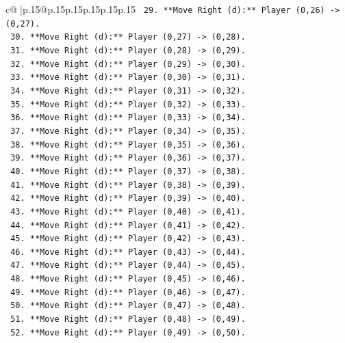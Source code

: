 \documentclass{article}
\begin{document}
{\begin{supertabular}{c@{$\;$}|p{.15\linewidth}@{}p{.15\linewidth}p{.15\linewidth}p{.15\linewidth}p{.15\linewidth}p{.15\linewidth}}
{{{\texttt{        29. **Move Right (d):** Player (0,26) {-}> (0,27).} \\
\texttt{        30. **Move Right (d):** Player (0,27) {-}> (0,28).} \\
\texttt{        31. **Move Right (d):** Player (0,28) {-}> (0,29).} \\
\texttt{        32. **Move Right (d):** Player (0,29) {-}> (0,30).} \\
\texttt{        33. **Move Right (d):** Player (0,30) {-}> (0,31).} \\
\texttt{        34. **Move Right (d):** Player (0,31) {-}> (0,32).} \\
\texttt{        35. **Move Right (d):** Player (0,32) {-}> (0,33).} \\
\texttt{        36. **Move Right (d):** Player (0,33) {-}> (0,34).} \\
\texttt{        37. **Move Right (d):** Player (0,34) {-}> (0,35).} \\
\texttt{        38. **Move Right (d):** Player (0,35) {-}> (0,36).} \\
\texttt{        39. **Move Right (d):** Player (0,36) {-}> (0,37).} \\
\texttt{        40. **Move Right (d):** Player (0,37) {-}> (0,38).} \\
\texttt{        41. **Move Right (d):** Player (0,38) {-}> (0,39).} \\
\texttt{        42. **Move Right (d):** Player (0,39) {-}> (0,40).} \\
\texttt{        43. **Move Right (d):** Player (0,40) {-}> (0,41).} \\
\texttt{        44. **Move Right (d):** Player (0,41) {-}> (0,42).} \\
\texttt{        45. **Move Right (d):** Player (0,42) {-}> (0,43).} \\
\texttt{        46. **Move Right (d):** Player (0,43) {-}> (0,44).} \\
\texttt{        47. **Move Right (d):** Player (0,44) {-}> (0,45).} \\
\texttt{        48. **Move Right (d):** Player (0,45) {-}> (0,46).} \\
\texttt{        49. **Move Right (d):** Player (0,46) {-}> (0,47).} \\
\texttt{        50. **Move Right (d):** Player (0,47) {-}> (0,48).} \\
\texttt{        51. **Move Right (d):** Player (0,48) {-}> (0,49).} \\
\texttt{        52. **Move Right (d):** Player (0,49) {-}> (0,50).} \\
}}}
\end{supertabular}}
\end{document}
